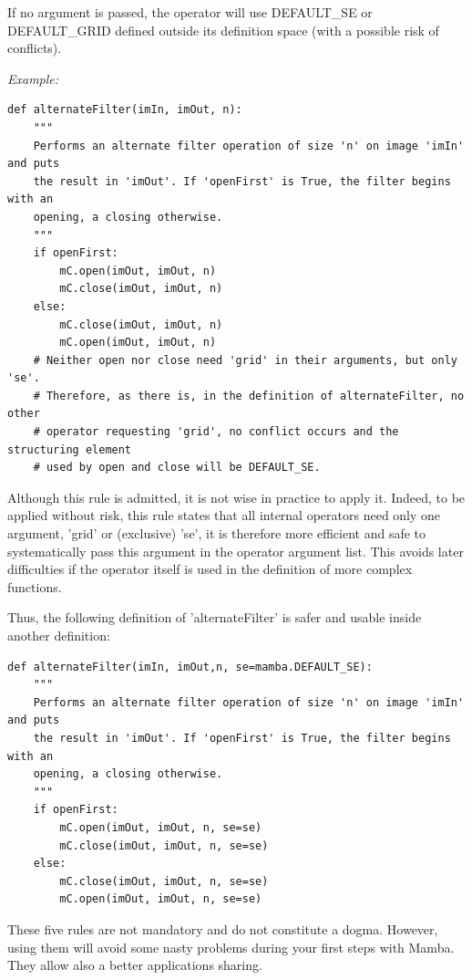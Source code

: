 \documentclass[a4paper,10pt,oneside]{article}
\begin{document}
If no argument is passed, the operator will use DEFAULT\_SE or DEFAULT\_GRID 
defined outside its definition space (with a possible risk of conflicts).\par

\emph{Example:}

\lstset{language=Python}
\begin{lstlisting}
def alternateFilter(imIn, imOut, n):
    """
    Performs an alternate filter operation of size 'n' on image 'imIn' and puts
    the result in 'imOut'. If 'openFirst' is True, the filter begins with an
    opening, a closing otherwise.
    """
    if openFirst:
        mC.open(imOut, imOut, n)
        mC.close(imOut, imOut, n)
    else:
        mC.close(imOut, imOut, n)
        mC.open(imOut, imOut, n)
    # Neither open nor close need 'grid' in their arguments, but only 'se'. 
    # Therefore, as there is, in the definition of alternateFilter, no other
    # operator requesting 'grid', no conflict occurs and the structuring element
    # used by open and close will be DEFAULT_SE.
\end{lstlisting}

Although this rule is admitted, it is not wise in practice to apply it. Indeed, 
to be applied without risk, this rule states that all internal operators need 
only one argument, 'grid' or (exclusive) 'se', it is therefore more efficient 
and safe to systematically pass this argument in the operator argument list. 
This avoids later difficulties if the operator itself is used in the definition 
of more complex functions.

Thus, the following definition of 'alternateFilter' is safer and usable inside 
another definition:

\lstset{language=Python}
\begin{lstlisting}
def alternateFilter(imIn, imOut,n, se=mamba.DEFAULT_SE):
    """
    Performs an alternate filter operation of size 'n' on image 'imIn' and puts
    the result in 'imOut'. If 'openFirst' is True, the filter begins with an
    opening, a closing otherwise.
    """
    if openFirst:
        mC.open(imOut, imOut, n, se=se)
        mC.close(imOut, imOut, n, se=se)
    else:
        mC.close(imOut, imOut, n, se=se)
        mC.open(imOut, imOut, n, se=se)
\end{lstlisting}

These five rules are not mandatory and do not constitute a dogma. However, 
using them will avoid some nasty problems during your first steps with Mamba. 
They allow also a better applications sharing.
\end{document}
